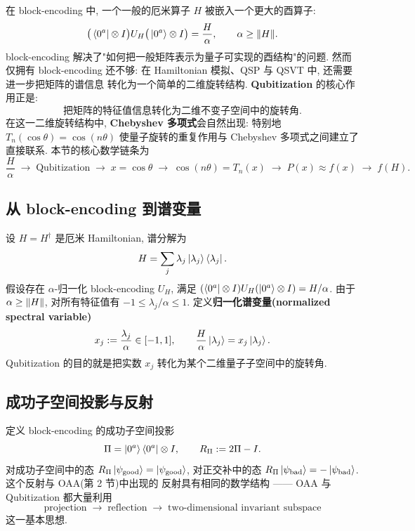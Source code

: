 \documentclass[utf8]{article} %
\numberwithin{equation}{section}   %
\begin{document}
在 block-encoding 中, 一个一般的厄米算子 $H$ 被嵌入一个更大的酉算子:
\begin{equation}
    \big(\bra{0^a}\otimes I\big) U_H \big(\ket{0^a}\otimes I\big) = \frac{H}{\alpha},
    \qquad \alpha \ge \norm{H}.
\end{equation}
block-encoding 解决了"如何把一般矩阵表示为量子可实现的酉结构"的问题. 然而仅拥有
block-encoding 还不够: 在 Hamiltonian 模拟、QSP 与 QSVT 中, 还需要进一步把矩阵的谱信息
转化为一个简单的二维旋转结构. \textbf{Qubitization} 的核心作用正是:
\begin{equation}
    \text{把矩阵的特征值信息转化为二维不变子空间中的旋转角}.
\end{equation}
在这一二维旋转结构中, \textbf{Chebyshev 多项式}会自然出现: 特别地
$T_n(\cos\theta) = \cos(n\theta)$ 使量子旋转的重复作用与 Chebyshev 多项式之间建立了直接联系.
本节的核心数学链条为
\begin{equation}
    \frac{H}{\alpha} \;\longrightarrow\; \text{Qubitization} \;\longrightarrow\;
    x = \cos\theta \;\longrightarrow\; \cos(n\theta) = T_n(x) \;\longrightarrow\;
    P(x) \approx f(x) \;\longrightarrow\; f(H).
\end{equation}

\subsection{从 block-encoding 到谱变量}

设 $H = H^\dagger$ 是厄米 Hamiltonian, 谱分解为
\begin{equation}
    H = \sum_j \lambda_j \ket{\lambda_j}\bra{\lambda_j}.
\end{equation}
假设存在 $\alpha$-归一化 block-encoding $U_H$, 满足
$(\bra{0^a}\otimes I)U_H(\ket{0^a}\otimes I) = H/\alpha$. 由于 $\alpha \ge \norm{H}$,
对所有特征值有 $-1 \le \lambda_j/\alpha \le 1$. 定义\textbf{归一化谱变量(normalized spectral variable)}
\begin{equation}
    x_j := \frac{\lambda_j}{\alpha} \in [-1, 1],
    \qquad
    \frac{H}{\alpha}\ket{\lambda_j} = x_j \ket{\lambda_j}.
\end{equation}
Qubitization 的目的就是把实数 $x_j$ 转化为某个二维量子子空间中的旋转角.

\subsection{成功子空间投影与反射}

定义 block-encoding 的成功子空间投影
\begin{equation}
    \Pi = \ket{0^a}\bra{0^a}\otimes I,
    \qquad
    R_\Pi := 2\Pi - I.
\end{equation}
对成功子空间中的态 $R_\Pi\ket{\psi_{\mathrm{good}}} = \ket{\psi_{\mathrm{good}}}$, 对正交补中的态
$R_\Pi\ket{\psi_{\mathrm{bad}}} = -\ket{\psi_{\mathrm{bad}}}$. 这个反射与 OAA(第 2 节)中出现的
反射具有相同的数学结构 —— OAA 与 Qubitization 都大量利用
\begin{equation}
    \text{projection} \;\to\; \text{reflection} \;\to\; \text{two-dimensional invariant subspace}
\end{equation}
这一基本思想.
\end{document}
